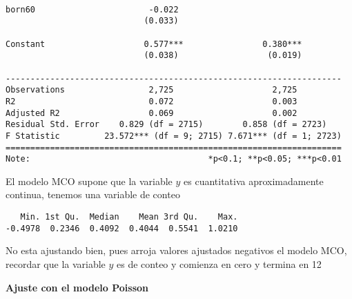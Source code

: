 \documentclass[
  letterpaper,
  DIV=11,
  numbers=noendperiod]{scrreprt}
\newenvironment{Shaded}{\begin{snugshade}}{\end{snugshade}}
\newcommand{\FunctionTok}[1]{\textcolor[rgb]{0.28,0.35,0.67}{#1}}
\newcommand{\NormalTok}[1]{\textcolor[rgb]{0.00,0.23,0.31}{#1}}
\newcommand{\SpecialCharTok}[1]{\textcolor[rgb]{0.37,0.37,0.37}{#1}}
\begin{document}
\begin{verbatim}
                                                                    
born60                       -0.022                                 
                            (0.033)                                 
                                                                    
Constant                    0.577***                0.380***        
                            (0.038)                  (0.019)        
                                                                    
--------------------------------------------------------------------
Observations                 2,725                    2,725         
R2                           0.072                    0.003         
Adjusted R2                  0.069                    0.002         
Residual Std. Error    0.829 (df = 2715)        0.858 (df = 2723)   
F Statistic         23.572*** (df = 9; 2715) 7.671*** (df = 1; 2723)
====================================================================
Note:                                    *p<0.1; **p<0.05; ***p<0.01
\end{verbatim}

El modelo MCO supone que la variable \(y\) es cuantitativa
aproximadamente continua, tenemos una variable de conteo

\begin{Shaded}
\end{Shaded}

\begin{verbatim}
   Min. 1st Qu.  Median    Mean 3rd Qu.    Max. 
-0.4978  0.2346  0.4092  0.4044  0.5541  1.0210 
\end{verbatim}

No esta ajustando bien, pues arroja valores ajustados negativos el
modelo MCO, recordar que la variable \(y\) es de conteo y comienza en
cero y termina en 12

\textbf{Ajuste con el modelo Poisson}
\end{document}
